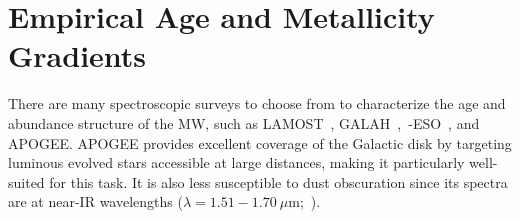
\section{Empirical Age and Metallicity Gradients}
\label{outflows:sec:empirical}
There are many spectroscopic surveys to choose from to characterize the age and
abundance structure of the MW, such as LAMOST~\citep{Luo2015},
GALAH~\citep{DeSilva2015, Martell2017},~\gaia-ESO~\citep{Gilmore2012}, and
APOGEE\space\citep{Majewski2017}.
APOGEE provides excellent coverage of the Galactic disk by targeting luminous
evolved stars accessible at large distances, making it particularly well-suited
for this task.
It is also less susceptible to dust obscuration since its spectra are at
near-IR wavelengths ($\lambda = 1.51 - 1.70~\mu$m;~\citealt{Wilson2019}).


